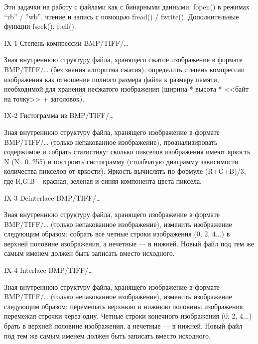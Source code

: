 
Эти задачки на работу с файлами как с бинарными данными: fopen() в режимах
“rb” / ”wb”, чтение и запись с помощью fread() / fwrite(). Дополнительные
функции fseek(), ftell().


IX-1 Степень компрессии BMP/TIFF/…

Зная внутреннюю структуру файла, хранящего сжатое изображение в формате
BMP/TIFF/… (без знания алгоритма сжатия), определить степень компрессии
изображения как отношение полного размера файла к размеру памяти, необходимой
для хранения несжатого изображения (ширина * высота * <<байт на точку>> +
заголовок).


IX-2 Гистограмма из BMP/TIFF/…

Зная внутреннюю структуру файла, хранящего изображение в формате BMP/TIFF/…
(только непакованное изображение), проанализировать содержимое и собрать
статистику: сколько пикселов изображения имеют яркость N (N=0..255) и
построить гистограмму (столбчатую диаграмму зависимости количества пикселов от
яркости). Яркость вычислять по формуле (R+G+B)/3, где R,G,B – красная, зеленая
и синяя компонента цвета пиксела.


IX-3 Deinterlace BMP/TIFF/…

Зная внутреннюю структуру файла, хранящего изображение в формате BMP/TIFF/…
(только непакованное изображение), изменить изображение следующим образом:
собрать все четные строки изображения (0, 2, 4...) в верхней половине
изображения, а нечетные — в нижней. Новый файл под тем же самым именем должен
быть записать вместо исходного.


IX-4 Interlace BMP/TIFF/…

Зная внутреннюю структуру файла, хранящего изображение в формате BMP/TIFF/…
(только непакованное изображение), изменить изображение следующим образом:
перемешать верхнюю и нижнюю половины изображения, перемежая строчки через
одну. Четные строки конечного изображения (0, 2, 4...) брать в верхней
половине изображения, а нечетные — в нижней. Новый файл под тем же самым
именем должен быть записать вместо исходного.

